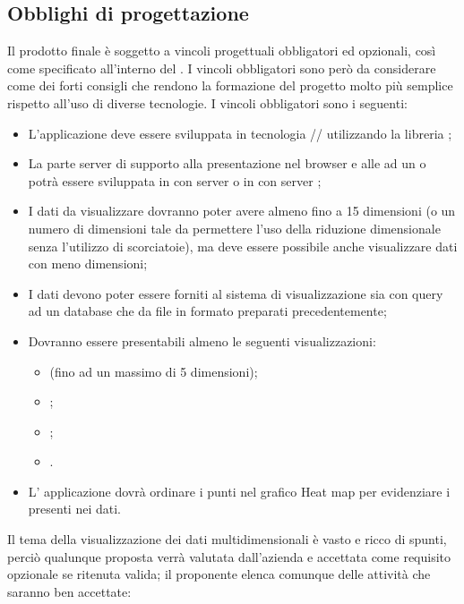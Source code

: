 \subsection{Obblighi di progettazione}
Il prodotto finale è soggetto a vincoli progettuali obbligatori ed opzionali, così come specificato all’interno del . I vincoli obbligatori sono però da considerare come dei forti consigli che rendono la formazione del progetto molto più semplice rispetto all'uso di diverse tecnologie.
I vincoli obbligatori sono i seguenti:
\begin{itemize}
	\item L'applicazione deve essere sviluppata in tecnologia // utilizzando la libreria ;
	\item La parte server di supporto alla presentazione nel browser e alle  ad un   o  potrà essere sviluppata in  con server  o in  con server ;
	\item I dati da visualizzare dovranno poter avere almeno fino a 15 dimensioni (o un numero di dimensioni tale da permettere l'uso della riduzione dimensionale senza l'utilizzo di scorciatoie), ma deve essere possibile anche visualizzare dati con meno dimensioni;
	\item I dati devono poter essere forniti al sistema di visualizzazione sia con query ad un database che da file in formato  preparati precedentemente;
	\item Dovranno essere presentabili almeno le seguenti visualizzazioni:
	\begin{itemize}
		\item {} (fino ad un massimo di 5 dimensioni);
		\item {};
		\item {};
		\item {}.
	\end{itemize}
	\item L' applicazione dovrà ordinare i punti nel grafico Heat map per evidenziare i presenti nei dati.
\end{itemize}
Il tema della visualizzazione dei dati multidimensionali è vasto e ricco di spunti, perciò qualunque proposta verrà valutata dall'azienda e accettata come requisito opzionale se ritenuta valida; il proponente elenca comunque delle attività che saranno ben accettate:
